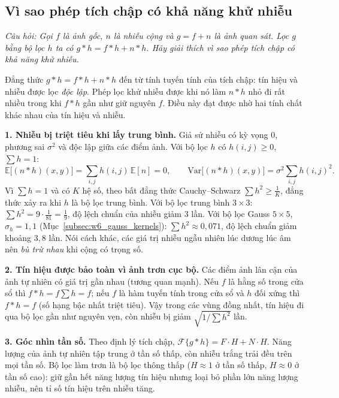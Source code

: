 \subsection{Vì sao phép tích chập có khả năng khử nhiễu}
\label{subsec:w6_conv_denoise}

\textit{Câu hỏi: Gọi $f$ là ảnh gốc, $n$ là nhiễu cộng và $g = f + n$ là ảnh quan sát. Lọc $g$ bằng bộ lọc $h$ ta có $g * h = f * h + n * h$. Hãy giải thích vì sao phép tích chập có khả năng khử nhiễu.}

Đẳng thức $g * h = f * h + n * h$ đến từ tính tuyến tính của tích chập: tín hiệu và nhiễu được lọc \emph{độc lập}. Phép lọc khử nhiễu được khi nó làm $n * h$ nhỏ đi rất nhiều trong khi $f * h$ gần như giữ nguyên $f$. Điều này đạt được nhờ hai tính chất khác nhau của tín hiệu và nhiễu.

\textbf{1. Nhiễu bị triệt tiêu khi lấy trung bình.} Giả sử nhiễu có kỳ vọng $0$, phương sai $\sigma^2$ và độc lập giữa các điểm ảnh. Với bộ lọc $h$ có $h(i, j) \ge 0$, $\sum h = 1$:
\begin{equation}
\mathbb{E}\big[(n * h)(x, y)\big] = \sum_{i, j} h(i, j)\,\mathbb{E}[n] = 0, \qquad
\mathrm{Var}\big[(n * h)(x, y)\big] = \sigma^2 \sum_{i, j} h(i, j)^2.
\end{equation}
Vì $\sum h = 1$ và có $K$ hệ số, theo bất đẳng thức Cauchy--Schwarz $\sum h^2 \ge \frac{1}{K}$, đẳng thức xảy ra khi $h$ là bộ lọc trung bình. Với bộ lọc trung bình $3 \times 3$: $\sum h^2 = 9 \cdot \frac{1}{81} = \frac{1}{9}$, độ lệch chuẩn của nhiễu giảm $3$ lần. Với bộ lọc Gauss $5 \times 5$, $\sigma_h = 1{,}1$ (Mục~\ref{subsec:w6_gauss_kernels}): $\sum h^2 \approx 0{,}071$, độ lệch chuẩn giảm khoảng $3{,}8$ lần. Nói cách khác, các giá trị nhiễu ngẫu nhiên lúc dương lúc âm nên \emph{bù trừ nhau} khi cộng có trọng số.

\textbf{2. Tín hiệu được bảo toàn vì ảnh trơn cục bộ.} Các điểm ảnh lân cận của ảnh tự nhiên có giá trị gần nhau (tương quan mạnh). Nếu $f$ là hằng số trong cửa sổ thì $f * h = f \sum h = f$; nếu $f$ là hàm tuyến tính trong cửa sổ và $h$ đối xứng thì $f * h = f$ (số hạng bậc nhất triệt tiêu). Vậy trong các vùng đồng nhất, tín hiệu đi qua bộ lọc gần như nguyên vẹn, còn nhiễu bị giảm $\sqrt{1/\sum h^2}$ lần.

\textbf{3. Góc nhìn tần số.} Theo định lý tích chập, $\mathcal{F}\{g * h\} = F \cdot H + N \cdot H$. Năng lượng của ảnh tự nhiên tập trung ở tần số thấp, còn nhiễu trắng trải đều trên mọi tần số. Bộ lọc làm trơn là bộ lọc thông thấp ($H \approx 1$ ở tần số thấp, $H \approx 0$ ở tần số cao): giữ gần hết năng lượng tín hiệu nhưng loại bỏ phần lớn năng lượng nhiễu, nên tỉ số tín hiệu trên nhiễu tăng.

